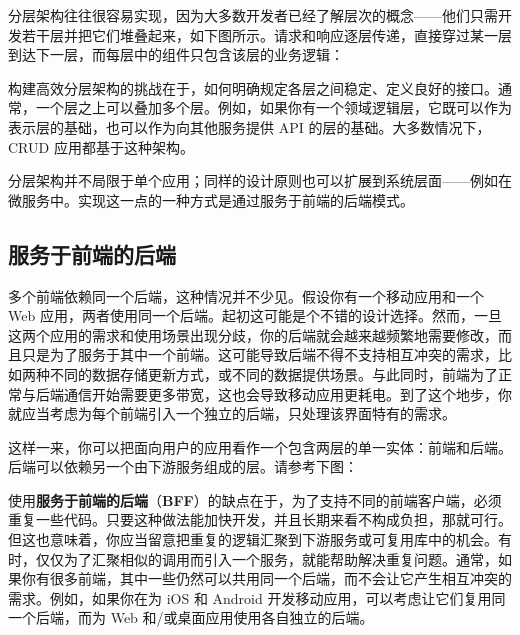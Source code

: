 分层架构往往很容易实现，因为大多数开发者已经了解层次的概念——他们只需开发若干层并把它们堆叠起来，如下图所示。请求和响应逐层传递，直接穿过某一层到达下一层，而每层中的组件只包含该层的业务逻辑：


\label{idx:122}
构建高效分层架构的挑战在于，如何明确规定各层之间稳定、定义良好的接口。通常，一个层之上可以叠加多个层。例如，如果你有一个领域逻辑层，它既可以作为表示层的基础，也可以作为向其他服务提供 API 的层的基础。大多数情况下，CRUD 应用都基于这种架构。

分层架构并不局限于单个应用；同样的设计原则也可以扩展到系统层面——例如在微服务中。实现这一点的一种方式是通过服务于前端的后端模式。

\subsection{服务于前端的后端}

\label{idx:123}
多个前端依赖同一个后端，这种情况并不少见。假设你有一个移动应用和一个 Web 应用，两者使用同一个后端。起初这可能是个不错的设计选择。然而，一旦这两个应用的需求和使用场景出现分歧，你的后端就会越来越频繁地需要修改，而且只是为了服务于其中一个前端。这可能导致后端不得不支持相互冲突的需求，比如两种不同的数据存储更新方式，或不同的数据提供场景。与此同时，前端为了正常与后端通信开始需要更多带宽，这也会导致移动应用更耗电。到了这个地步，你就应当考虑为每个前端引入一个独立的后端，只处理该界面特有的需求。

这样一来，你可以把面向用户的应用看作一个包含两层的单一实体：前端和后端。后端可以依赖另一个由下游服务组成的层。请参考下图：


\label{idx:124}
\label{idx:125}
使用\textbf{服务于前端的后端}（\textbf{BFF}）的缺点在于，为了支持不同的前端客户端，必须重复一些代码。只要这种做法能加快开发，并且长期来看不构成负担，那就可行。但这也意味着，你应当留意把重复的逻辑汇聚到下游服务或可复用库中的机会。有时，仅仅为了汇聚相似的调用而引入一个服务，就能帮助解决重复问题。通常，如果你有很多前端，其中一些仍然可以共用同一个后端，而不会让它产生相互冲突的需求。例如，如果你在为 iOS 和 Android 开发移动应用，可以考虑让它们复用同一个后端，而为 Web 和/或桌面应用使用各自独立的后端。

